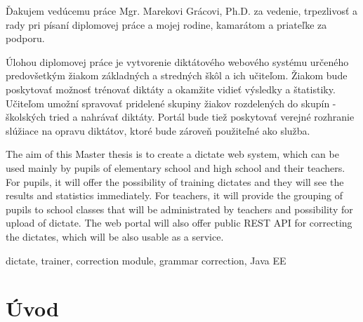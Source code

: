 \documentclass[12pt,oneside]{fithesis2}
\begin{document}
  \FrontMatter                    %
    \ThesisTitlePage                %
    \begin{ThesisDeclaration}       %
      \DeclarationText
      \AdvisorName
    \end{ThesisDeclaration}
    \begin{ThesisThanks}            %
      Ďakujem vedúcemu práce Mgr. Marekovi Grácovi, Ph.D. za vedenie, trpezlivosť a rady pri písaní diplomovej
       práce a mojej rodine, kamarátom a priateľke za podporu.
    \end{ThesisThanks}
    \begin{ThesisAbstract}          %
      Úlohou diplomovej práce je vytvorenie diktátového webového systému určeného predovšetkým žiakom základných
      a stredných škôl a ich učiteľom. Žiakom bude poskytovať možnosť trénovať diktáty a okamžite vidieť výsledky a štatistiky. Učiteľom umožní spravovať pridelené skupiny žiakov rozdelených do skupín - školských tried a nahrávať diktáty. Portál bude tiež poskytovať verejné rozhranie slúžiace na opravu diktátov, ktoré bude zároveň použiteľné ako služba.
    \end{ThesisAbstract}
    \begin{ThesisAbstracten}          %

      The aim of this Master thesis is to create a dictate web system, which can be used mainly by pupils of
      elementary school and high school and their teachers. For pupils, it will offer the possibility of training dictates and they will see the results and statistics immediately. For teachers, it will provide the grouping of pupils to school classes that will be administrated by teachers and possibility for upload of dictate. The web portal will also offer public REST API for correcting the dictates, which will be also usable as a service.
    \end{ThesisAbstracten}
    \begin{ThesisKeyWords}          %
      dictate, trainer, correction module, grammar correction, Java EE
    \end{ThesisKeyWords}
    \tableofcontents                %
  
  \MainMatter                     %
    \chapter{Úvod}          %
  
\end{document}
